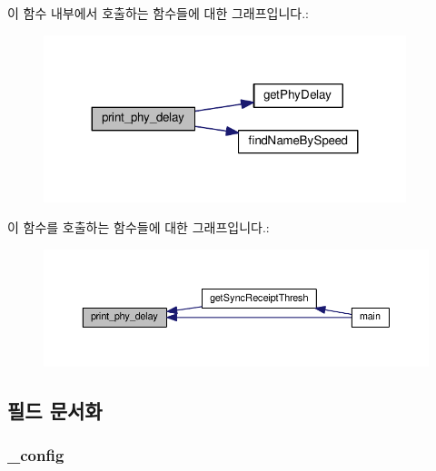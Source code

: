 이 함수 내부에서 호출하는 함수들에 대한 그래프입니다.\+:
\nopagebreak
\begin{figure}[H]
\begin{center}
\leavevmode
\includegraphics[width=299pt]{class_gptp_ini_parser_ae8f7d18c76a73ce35ae58fe57852fe8d_cgraph}
\end{center}
\end{figure}




이 함수를 호출하는 함수들에 대한 그래프입니다.\+:
\nopagebreak
\begin{figure}[H]
\begin{center}
\leavevmode
\includegraphics[width=350pt]{class_gptp_ini_parser_ae8f7d18c76a73ce35ae58fe57852fe8d_icgraph}
\end{center}
\end{figure}




\subsection{필드 문서화}
\subsubsection[{\texorpdfstring{\+\_\+config}{_config}}]{ \+\_\+config\hspace{0.3cm}{\ttfamily [private]}}\hypertarget{class_gptp_ini_parser_a8733e97ddaee116e34a67d3e222e45c9}{}\label{class_gptp_ini_parser_a8733e97ddaee116e34a67d3e222e45c9}


